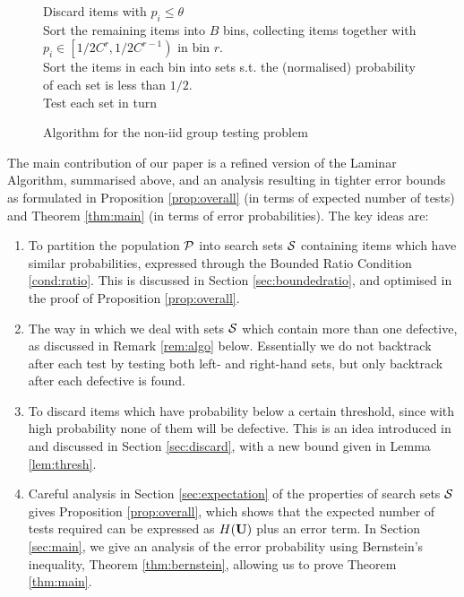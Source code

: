 \begin{figure}
\begin{algorithmic}
 Discard items with \(p_i \leq \theta\)
 \\
 Sort the remaining items into \(B\) bins, collecting items together with \(p_i \in \left[1/2C^r,1/2C^{r-1}\right)\) in bin \(r\).
 \\
 Sort the items in each bin into sets s.t. the (normalised) probability of each set is less than \(1/2\).
 \\
 Test each set in turn
 \\
	\EndIf

\end{algorithmic}
 \caption{Algorithm for the non-iid group testing problem}
\end{figure}

The main contribution of our paper is a refined version of the Laminar Algorithm, summarised above, and an analysis resulting in tighter error bounds as formulated in Proposition \ref{prop:overall} (in terms of expected number of tests) and Theorem \ref{thm:main} (in terms
of error probabilities).
The  key ideas are:
\begin{enumerate}
\item To partition the population ${\mathcal{P}}$ into search  sets  ${\mathcal{S}}$ containing items which have similar probabilities,
expressed through the Bounded Ratio Condition \ref{cond:ratio}. This is discussed in Section \ref{sec:boundedratio}, and optimised in the proof
of Proposition \ref{prop:overall}.
\item The way in which we deal with sets ${\mathcal{S}}$ which contain more than one defective, as discussed in Remark \ref{rem:algo} below. Essentially we do not backtrack after each test by
testing both left- and right-hand sets, but only backtrack after each defective is found.
\item To discard items which have probability below a certain
threshold, since with high probability none of them will be defective. This is an idea introduced in \cite{li5} and discussed
in Section \ref{sec:discard}, with a new bound given in Lemma \ref{lem:thresh}.
\item  Careful analysis in Section \ref{sec:expectation} of the properties of search sets ${\mathcal{S}}$ gives Proposition \ref{prop:overall}, which shows that the expected number of tests required can
be expressed as $H({\mathbf{ U}})$ plus an error term. In Section \ref{sec:main},
we give an analysis of the error probability using Bernstein's inequality, Theorem \ref{thm:bernstein}, allowing us to
prove Theorem \ref{thm:main}.
\end{enumerate}
%


